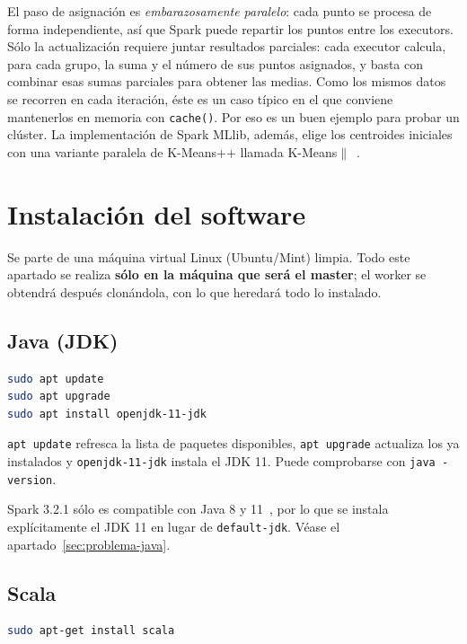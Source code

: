 \documentclass[11pt,a4paper]{article}
\begin{document}
El paso de asignación es \emph{embarazosamente paralelo}: cada punto se procesa de forma independiente, así que Spark puede repartir los puntos entre los executors. Sólo la actualización requiere juntar resultados parciales: cada executor calcula, para cada grupo, la suma y el número de sus puntos asignados, y basta con combinar esas sumas parciales para obtener las medias. Como los mismos datos se recorren en cada iteración, éste es un caso típico en el que conviene mantenerlos en memoria con \texttt{cache()}. Por eso es un buen ejemplo para probar un clúster. La implementación de Spark MLlib, además, elige los centroides iniciales con una variante paralela de K-Means++ llamada K-Means$\|$~\cite{spark-mllib-clustering}.

\section{Instalación del software}

Se parte de una máquina virtual Linux (Ubuntu/Mint) limpia. Todo este apartado se realiza \textbf{sólo en la máquina que será el master}; el worker se obtendrá después clonándola, con lo que heredará todo lo instalado.

\subsection{Java (JDK)}
\begin{lstlisting}[language=bash]
sudo apt update
sudo apt upgrade
sudo apt install openjdk-11-jdk
\end{lstlisting}
\texttt{apt update} refresca la lista de paquetes disponibles, \texttt{apt upgrade} actualiza los ya instalados y \texttt{openjdk-11-jdk} instala el JDK 11. Puede comprobarse con \texttt{java -version}.

\begin{aviso}
Spark 3.2.1 sólo es compatible con Java 8 y 11~\cite{spark-overview}, por lo que se instala explícitamente el JDK 11 en lugar de \texttt{default-jdk}. Véase el apartado~\ref{sec:problema-java}.
\end{aviso}

\subsection{Scala}
\begin{lstlisting}[language=bash]
sudo apt-get install scala
\end{lstlisting}
\end{document}

